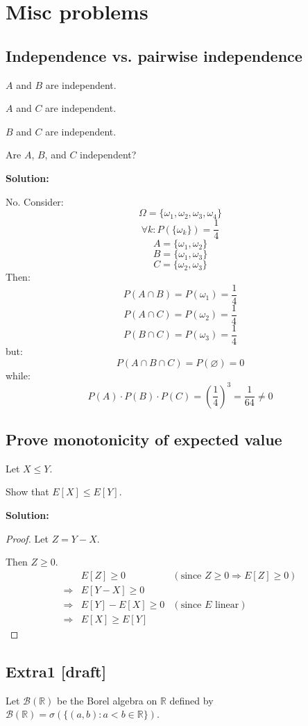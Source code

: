 \documentclass{article}
\begin{document}
\section{Misc problems}
\subsection{Independence vs. pairwise independence}
\(A\) and \(B\) are independent.

\(A\) and \(C\) are independent.

\(B\) and \(C\) are independent.

Are \(A\), \(B\), and \(C\) independent?

\textbf{Solution:}

No. Consider:
\[\Omega = \{\omega_1,\omega_2,\omega_3,\omega_4\}\]
\[\forall k: P(\{\omega_k\}) = \frac14\]
\[A = \{\omega_1,\omega_2\}\]
\[B = \{\omega_1,\omega_3\}\]
\[C = \{\omega_2,\omega_3\}\]
Then:
\[P(A \cap B) = P(\omega_1)=\frac14\]
\[P(A \cap C) = P(\omega_2)=\frac14\]
\[P(B \cap C) = P(\omega_3)=\frac14\]
but:
\[P(A\cap B \cap C) = P(\varnothing)=0\]
while:
\[P(A)\cdot P(B) \cdot P(C) = (\frac{1}{4})^3=\frac{1}{64}\neq 0\]

\subsection{Prove monotonicity of expected value}
Let \(X\leq Y\).

Show that \(E[X]\leq E[Y]\).

\textbf{Solution:}

\begin{proof}
Let \(Z=Y-X\).

Then \(Z\geq 0\).
\begin{align*}
     & E[Z]\geq 0 & (\text{since }Z\geq 0 \Rightarrow E[Z]\geq 0) \\
    \Rightarrow& E[Y-X] \geq 0 \\
    \Rightarrow& E[Y]-E[X] \geq 0 & (\text{since }E\text{ linear}) \\
    \Rightarrow& E[X]\geq E[Y]
\end{align*}
\end{proof}

\subsection{Extra1 [draft]}

Let \(\mathcal{B}(\mathbb{R})\) be the Borel algebra on \(\mathbb{R}\)
defined by \(\mathcal{B}(\mathbb{R})=\sigma(\{(a,b): a<b \in \mathbb{R}\})\).
\end{document}

